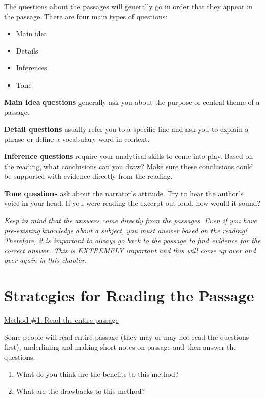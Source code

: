 \bigskip
The questions about the passages will generally go in order that they appear in the passage. There are four main types of questions:

\begin{itemize}
\item Main idea
\item Details
\item Inferences
\item Tone
\end{itemize}

\bigskip
\textbf{Main idea questions} generally ask you about the purpose or central theme of a passage.

\bigskip
\textbf{Detail questions} usually refer you to a specific line and ask you to explain a phrase or define a vocabulary word in context.

\bigskip
\textbf{Inference questions} require your analytical skills to come into play.  Based on the reading, what conclusions can you draw?  Make sure these conclusions could be supported with evidence directly from the reading.

\bigskip
\textbf{Tone questions} ask about the narrator's attitude.  Try to hear the author's voice in your head.  If you were reading the excerpt out loud, how would it sound? 

\bigskip
\textit{Keep in mind that the answers come directly from the passages.  Even if you have pre-existing knowledge about a subject, you must answer based on the reading! Therefore, it is important to always go back to the passage to find evidence for the correct answer. This is EXTREMELY important and this will come up over and over again in this chapter.}

\newpage
\section[Reading the Passage]{Strategies for Reading the Passage}

\underline{Method \#1: Read the entire passage}

Some people will read entire passage (they may or may not read the questions first), underlining and making short notes on passage and then answer the questions. 

\bigskip
\begin{enumerate}
\item What do you think are the benefits to this method?
\vfill\item What are the drawbacks to this method?
\end{enumerate}


